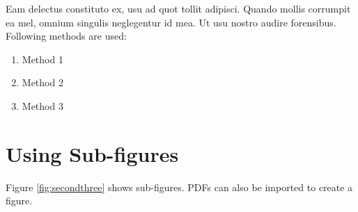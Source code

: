 \documentclass[copyright, reqno]{vcuthesis}
\numberwithin{equation}{chapter}
\begin{document}
Eam delectus constituto ex, usu ad quot tollit adipisci. Quando mollis corrumpit ea mel, omnium singulis neglegentur id mea. Ut usu nostro audire forensibus. Following methods are used:
\begin{enumerate}
\item Method 1
\item Method 2
\item Method 3
\end{enumerate}

\section{Using Sub-figures}
Figure \ref{fig:secondthree} shows sub-figures.
PDFs can also be imported to create a figure.

\begin{figure}
\centering
\end{figure}
\end{document}
